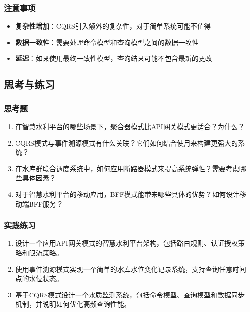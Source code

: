 \subsubsection{注意事项}\label{ux6ce8ux610fux4e8bux9879-5}

\begin{itemize}
\tightlist
\item
  \textbf{复杂性增加}：CQRS引入额外的复杂性，对于简单系统可能不值得
\item
  \textbf{数据一致性}：需要处理命令模型和查询模型之间的数据一致性
\item
  \textbf{延迟}：如果使用最终一致性模型，查询结果可能不包含最新的更改
\end{itemize}

\subsection{思考与练习}\label{ux601dux8003ux4e0eux7ec3ux4e60}

\subsubsection{思考题}\label{ux601dux8003ux9898}

\begin{enumerate}
\def\labelenumi{\arabic{enumi}.}
\item
  在智慧水利平台的哪些场景下，聚合器模式比API网关模式更适合？为什么？
\item
  CQRS模式与事件溯源模式有什么关联？它们如何结合使用来构建更强大的系统？
\item
  在水库群联合调度系统中，如何应用断路器模式来提高系统弹性？需要考虑哪些具体因素？
\item
  对于智慧水利平台的移动应用，BFF模式能带来哪些具体的优势？如何设计移动端BFF服务？
\end{enumerate}

\subsubsection{实践练习}\label{ux5b9eux8df5ux7ec3ux4e60}

\begin{enumerate}
\def\labelenumi{\arabic{enumi}.}
\item
  设计一个应用API网关模式的智慧水利平台架构，包括路由规则、认证授权策略和限流策略。
\item
  使用事件溯源模式实现一个简单的水库水位变化记录系统，支持查询任意时间点的水位状态。
\item
  基于CQRS模式设计一个水质监测系统，包括命令模型、查询模型和数据同步机制，并说明如何优化高频查询性能。
\end{enumerate}
